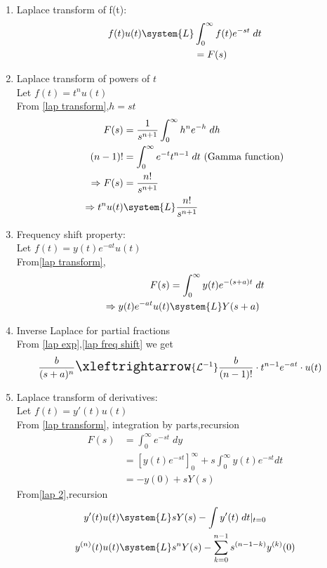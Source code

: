 \begin{enumerate}[label=\thechapter.\arabic*,ref=\thechapter.\theenumi]
\item Laplace transform of f(t):
\begin{align}
        f(t)u(t)\system{L}&\int_{0}^{\infty}f(t)e^{-st}\; dt\\
        &=F(s)\label{lap transform}
\end{align}
\item Laplace transform of powers of $t$\\ 
        Let $f(t)=t^nu(t)$\\
From \eqref{lap transform},$h=st$
\begin{align}
        F(s)&=\frac{1}{s^{n+1}}\int_{0}^{\infty}h^ne^{-h}\;dh\label{lap 1}\\
        (n-1)!&=\int_0^\infty e^{-t}t^{n-1}\;dt\text{ (Gamma function)}\label{gamma}\\
        \Rightarrow F(s)&=\frac{n!}{s^{n+1}}\\
        \Rightarrow t^nu(t)&\system{L}\frac{n!}{s^{n+1}}\label{lap exp}
\end{align}
\item Frequency shift property:\\
        Let $f(t)=y(t)e^{-at}u(t)$\\
From\eqref{lap transform},
\begin{align}
        F(s)&=\int_0^{\infty}y(t)e^{-(s+a)t}\;dt\\
        \Rightarrow y(t)e^{-at}u(t)&\system{L}Y(s+a)\label{lap freq shift}
\end{align}
\item Inverse Laplace for partial fractions\\
From \eqref{lap exp},\eqref{lap freq shift} we get
\begin{align}
    &\frac{b}{(s+a)^n}\Large\xleftrightarrow{\mathcal{L}^{-1}}\frac{b}{(n-1)!}\cdot t^{n-1} e^{-at}\cdot u(t)\label{inv lap (partial fractions)}
\end{align}
\item Laplace transform of derivatives:\\
        Let $f(t)=y'(t)u(t)$\\
From \eqref{lap transform}, integration by parts,recursion
\begin{align}
        F(s)&=\int_{0}^\infty e^{-st}\; dy\\
        &=[y(t)e^{-st}]_0^\infty+s\int_0^\infty y(t)e^{-st}dt\\
        &=-y(0)+sY(s)\label{lap 2}
\end{align}
From\eqref{lap 2},recursion
\begin{align}
        y'(t)u(t)&\system{L}sY(s)-\int y'(t)\;dt\vert_{t=0}\\
        y^{(n)}(t)u(t)&\system{L}s^nY(s)-\sum\limits_{k=0}^{n-1}s^{(n-1-k)}y^{(k)}(0)\label{lap (derivatives)}
\end{align}
\end{enumerate}

